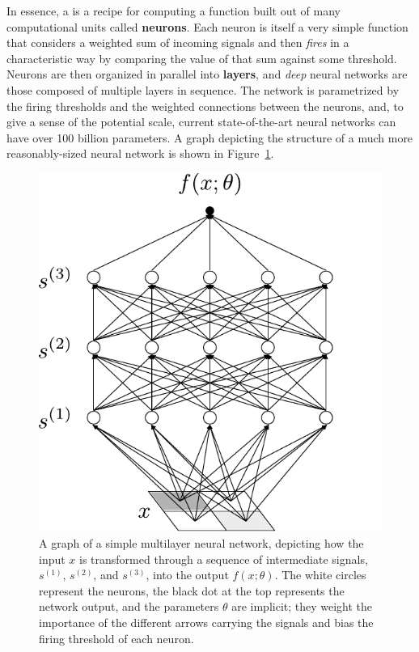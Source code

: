 In essence,
a  is a recipe for computing a function built out of many computational units called \textbf{neurons}. Each neuron is itself a very simple function that 
considers %
a weighted sum of incoming signals and then \emph{fires} in a characteristic way by comparing the value of that sum against some threshold. 
Neurons are then organized in parallel into \textbf{layers}, and \emph{deep} neural networks are those composed of multiple layers in sequence.
The network  is parametrized by the firing thresholds and the weighted connections between the neurons, and, to give a sense of the potential scale, current state-of-the-art neural networks can have over 100 billion parameters. A graph depicting the structure of a much more reasonably-sized neural network is shown in Figure~\ref{fig:mlp-simple}.










\begin{figure}
\begin{center}
 \includegraphics[scale=.7]{./book_figures/mlp-simple.pdf}
\caption{A 
graph
of a simple multilayer neural network, depicting how the input $x$ is transformed through a sequence of intermediate signals, $s^{(1)}$, $s^{(2)}$, and $s^{(3)}$, into the output $f(x;\theta)$.  The white circles represent the neurons, the black dot at the top represents the network output, and the parameters $\theta$ are implicit; they weight the importance of the different arrows carrying the signals and bias the firing threshold of each neuron.
}
\label{fig:mlp-simple}
\end{center}
\end{figure}

